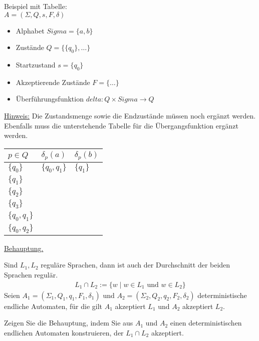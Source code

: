 \documentclass{uebungsblatt}
\begin{document}
\begin{loesung}
Beispiel mit Tabelle:\\
$A = (\Sigma, Q, s, F, \delta)$
\begin{itemize}
    \item Alphabet $Sigma = \{a,b\}$ 
    \item Zustände $Q = \{\{q_0\}, \dots \}$
    \item Startzustand $s = \{q_0\}$
    \item Akzeptierende Zustände $F = \{ \dots \}$
    \item Überführungsfunktion $delta : Q \times Sigma \rightarrow Q$
\end{itemize}

\smallskip
\underline{Hinweis:}
Die Zustandsmenge sowie die Endzustände müssen noch ergänzt werden. Ebenfalls muss die unterstehende Tabelle für die Übergangsfunktion ergänzt werden.

\begin{center}
    \begin{tabular}{l|l|l}
    $p \in Q$ & $\delta_p(a)$ & $\delta_p(b)$ \\
    \hline
    $\{q_0\}$ & $\{q_0, q_1\}$ & $\{q_1\}$      \\
    $\{q_1\}$ &  &  \\
    $\{q_2\}$ &  &  \\
    $\{q_3\}$ &  &  \\
    $\{q_0, q_1\}$ &  &  \\
    $\{q_0, q_2\}$ &  &  \\
    \end{tabular}
\end{center}
\end{loesung}
\newpage
\begin{aufgabe}
\underline{Behauptung.}

\smallskip
Sind $L_1, L_2$ reguläre Sprachen, dann ist auch der Durchschnitt  der beiden Sprachen regulär.
\begin{align*}
L_1 \cap L_2:=\{w \mid w\in L_1\text{ und }w\in L_2\}    
\end{align*}
Seien $A_1 = (\Sigma_1, Q_1, q_1, F_1, \delta_1)$ und $A_2 = (\Sigma_2, Q_2, q_2, F_2, \delta_2)$ 
deterministische endliche Automaten, für die gilt $A_1$ akzeptiert $L_1$
und $A_2$ akzeptiert $L_2$.

\medskip
Zeigen Sie die Behauptung, indem Sie aus $A_1$ und $A_2$ einen
deterministischen endlichen Automaten konstruieren, der $L_1 \cap L_2$ akzeptiert.\\

\end{aufgabe}
\begin{loesung}

\end{loesung}
\end{document}

